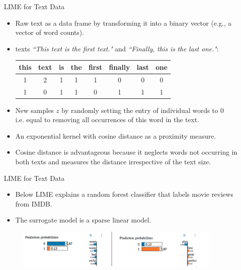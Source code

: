 \documentclass[aspectratio=169]{../latex_main/tntbeamer}  %
\begin{document}
\begin{frame}[c]{LIME for Text Data }
	\begin{itemize}
		\item Raw text as a data frame by transforming it into a binary vector (e.g., a vector of word counts).
		\item texts \textit{``This text is the first text."} and \textit{``Finally, this is the last one."}:
		\begin{center}
			\begin{tabular}{c|c|c|c|c|c|c|c} 
				this & text & is & the & first & finally & last & one \\ 
				\hline
				1 & 2 & 1 & 1 & 1 & 0 & 0 & 0 \\
				1 & 0 & 1 & 1 & 0 & 1 & 1 & 1 \\
			\end{tabular}
		\end{center} 
		\item New samples $z$ by randomly setting the entry of individual words to $0$\\ i.e. equal to removing all occurrences of this word in the text. 
		\item An exponential kernel with cosine distance as a proximity measure. 
		\item Cosine distance is advantageous  because it neglects words not occurring in both texts and measures the distance irrespective of the text size. 
	\end{itemize}

\end{frame}

\begin{frame}[c]{LIME for Text Data }

    \begin{itemize}
		
		\item Below LIME explains a random forest classifier that labels movie reviews from IMDB. 
		\item The surrogate model is a sparse linear model. 
	\end{itemize}
	
	\begin{figure}
		\begin{center}
			\includegraphics[width=0.9\textwidth]{figure/lime_movier}
		\end{center}
	\end{figure}
	
\end{frame}
	
\end{document}
